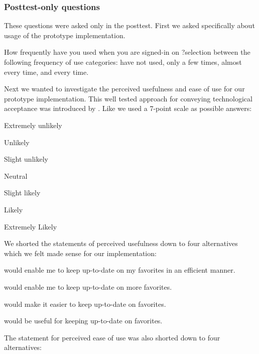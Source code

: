 \subsubsection{Posttest-only questions}

These questions were asked only in the posttest. First we asked specifically
about usage of the prototype implementation.

\begin{items}
  \item How frequently have you used \latest{} when you are
    signed-in on \urort{}?\dash{}selection between the following
    frequency of use categories: have not used, only a few times, almost
    every time, and every time.
\end{items}

Next we wanted to investigate the perceived usefulness and ease of use for
our prototype implementation. This well tested approach for conveying
technological acceptance was introduced by \citet{davis89}.
Like \citet[]{davis89} we used a 7-point scale as possible answers:

\begin{items}
  \item Extremely unlikely
  \item Unlikely
  \item Slight unlikely
  \item Neutral
  \item Slight likely
  \item Likely
  \item Extremely Likely
\end{items}

We shorted the statements of perceived usefulness down to four alternatives
which we felt made sense for our implementation:

\begin{items}
  \item \latest{} would enable me to keep up-to-date on my favorites in an
    efficient manner.
  \item \latest{} would enable me to keep up-to-date on more favorites.
  \item \latest{} would make it easier to keep up-to-date on favorites.
  \item \latest{} would be useful for keeping up-to-date on favorites.
\end{items}

The statement for perceived ease of use was also shorted down to four
alternatives:

